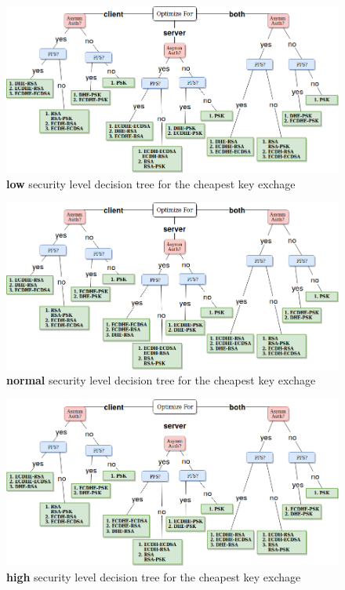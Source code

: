\documentclass{llncs}
\begin{document}
\begin{figure}
  \centering
  \includegraphics[width=1.0\textwidth]{img/dt_low_sl.png}
  \centering \caption{\label{fig:dt-low-sl} \textbf{low} security level decision tree for the cheapest key exchage}
\end{figure}

\begin{figure}
  \centering
  \includegraphics[width=1.0\textwidth]{img/dt_normal_sl.png}
  \centering \caption{\label{fig:dt-normal-sl} \textbf{normal} security level decision tree for the cheapest key exchage}
\end{figure}

\begin{figure}
  \centering
  \includegraphics[width=1.0\textwidth]{img/dt_high_sl.png}
  \centering \caption{\label{fig:dt-high-sl} \textbf{high} security level decision tree for the cheapest key exchage}
\end{figure}
\end{document}

